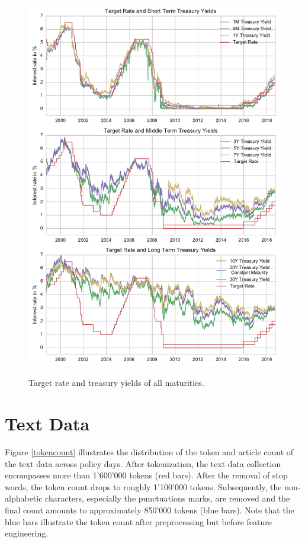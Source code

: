 \documentclass[11pt,a4paper,english,oneside]{book}
\numberwithin{equation}{chapter}
\begin{document}
\begin{figure}
	\caption{Target rate and treasury yields of all maturities.}
	\centering
	\includegraphics[scale=1]{Images/alltreasury.pdf}
	\label{alltreasury}
\end{figure}


\renewcommand{\theequation}{B.\arabic{equation}}


\chapter{Text Data}\label{AppendixB}

Figure \ref{tokencount} illustrates the distribution of the token and article count of the text data across policy days.
After tokenization, the text data collection encompasses more than 1’600’000 tokens (red bars). After
the removal of stop words, the token count drops to roughly 1’100’000 tokens. Subsequently, the
non-alphabetic characters, especially the punctuations marks, are removed and the final count
amounts to approximately 850’000 tokens (blue bars). Note that the blue bars illustrate the token count after preprocessing
but before feature engineering.
\end{document}
